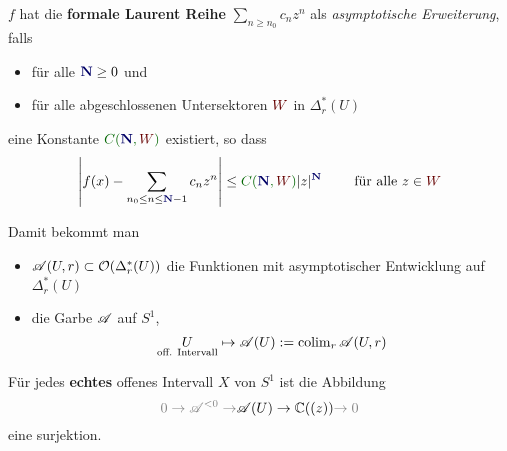 \begin{defn}
  \def\myN{\textbf{\textcolor{blue!40!black}{N}}}
  \def\mySect{\textcolor{red!40!black}{W}}
  \def\myConst{\textcolor{green!40!black}{C(\myN,\mySect)}}
  $f$ hat die \textbf{formale Laurent Reihe} $\sum_{n\geq n_0}c_nz^n$ als
  \emph{asymptotische Erweiterung}, falls
  \begin{itemize}
    \item für alle $\myN\geq0$ und
    \item für alle abgeschlossenen Untersektoren $\mySect$ in $\Delta_r^*(U)$
      \TODO
  \end{itemize}
  eine Konstante $\myConst$ existiert, so dass
  \[
    \left|
      f(x)-\sum_{n_0\leq n\leq \myN-1}c_nz^n
    \right|
    \leq \myConst|z|^{\myN} \qquad \text{ für alle } z\in \mySect
  \]
  \begin{comment}
    \Leftrightarrow{}
    \[
      \lim_{z\to0,z\in{\mySect}}
      |z|^{-(\myN-1)}
      \left|
      f(x)-\sum_{n_0\leq n\leq \myN-1}c_nz^n
      \right|=0
      \qquad \text{ für alle } z\in \mySect
    \]
  \end{comment}
  Damit bekommt man
  \begin{itemize}
    \item $\mathscr{A}(U,r)\subset\mathcal{O}(\Delta_r^*(U))$ die Funktionen mit asymptotischer
      Entwicklung auf $\Delta_r^*(U)$
    \item die Garbe $\mathscr{A}$ auf $S^1$,
      \[
        \underset{\text{off. Intervall}}{U}\mapsto\mathscr{A}(U):=\operatorname{colim}_r\mathscr{A}(U,r)
      \]
  \end{itemize}
\end{defn}
\begin{lem}
  Für jedes \textbf{echtes} offenes Intervall $X$ von $S^1$ ist die Abbildung
  \[
    \textcolor{gray}{0\to \sA^{<0} \to}
    \sA(U)\to \C((z))
    \textcolor{gray}{\to0}
  \]
  eine surjektion.
\end{lem}
